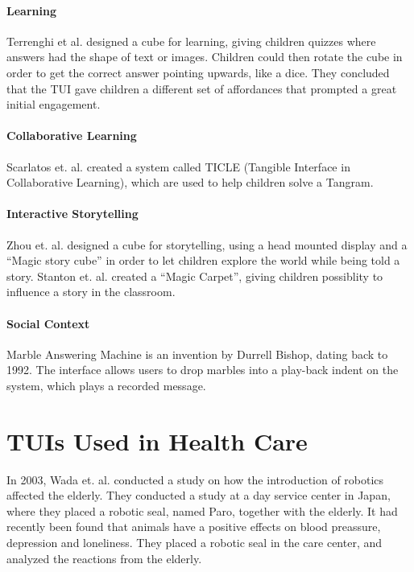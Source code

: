 \paragraph{Learning}
Terrenghi et al. designed a cube for learning, giving children quizzes where answers had the shape of text or images\cite{terrenghi2006cube}. Children could then rotate the cube in order to get the correct answer pointing upwards, like a dice. They concluded that the TUI gave children a different set of affordances that prompted a great initial engagement\cite{terrenghi2006cube}. 

\paragraph{Collaborative Learning}
Scarlatos et. al. created a system called TICLE (Tangible Interface in Collaborative Learning), which are used to help children solve a Tangram\cite{scarlatos1999ticle}.  

\paragraph{Interactive Storytelling}
Zhou et. al. designed a cube for storytelling, using a head mounted display and a ``Magic story cube'' in order to let children explore the world while being told a story\cite{zhou2004magic}. Stanton et. al. created a ``Magic Carpet'', giving children possiblity to influence a story in the classroom\cite{stanton2001classroom}. 
 
\paragraph{Social Context}
Marble Answering Machine is an invention by Durrell Bishop, dating back to 1992\cite{crampton1995hand}. The interface allows users to drop marbles into a play-back indent on the system, which plays a recorded message.   

\section{TUIs Used in Health Care}
\label{sec:effectofrobots}
In 2003, Wada et. al. conducted a study on how the introduction of robotics affected the elderly\cite{wada2004effects}. They conducted a study at a day service center in Japan, where they placed a robotic seal, named Paro, together with the elderly. It had recently been found that animals have a positive effects on blood preassure, depression and loneliness. They placed a robotic seal in the care center, and analyzed the reactions from the elderly. 

